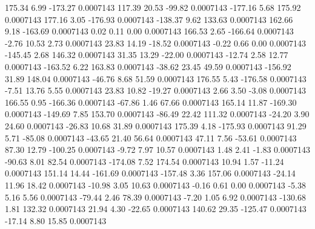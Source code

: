       175.34        6.99     -173.27     0.0007143
      117.39       20.53      -99.82     0.0007143
     -177.16        5.68      175.92     0.0007143
      177.16        3.05     -176.93     0.0007143
     -138.37        9.62      133.63     0.0007143
      162.66        9.18     -163.69     0.0007143
        0.02        0.11        0.00     0.0007143
      166.53        2.65     -166.64     0.0007143
       -2.76       10.53        2.73     0.0007143
       23.83       14.19      -18.52     0.0007143
       -0.22        0.66        0.00     0.0007143
     -145.45        2.68      146.32     0.0007143
       31.35       13.29      -22.00     0.0007143
      -12.74        2.58       12.77     0.0007143
     -163.52        6.22      163.83     0.0007143
      -38.62       23.45       49.59     0.0007143
     -156.92       31.89      148.04     0.0007143
      -46.76        8.68       51.59     0.0007143
      176.55        5.43     -176.58     0.0007143
       -7.51       13.76        5.55     0.0007143
       23.83       10.82      -19.27     0.0007143
        2.66        3.50       -3.08     0.0007143
      166.55        0.95     -166.36     0.0007143
      -67.86        1.46       67.66     0.0007143
      165.14       11.87     -169.30     0.0007143
     -149.69        7.85      153.70     0.0007143
      -86.49       22.42      111.32     0.0007143
      -24.20        3.90       24.60     0.0007143
      -26.83       10.68       31.89     0.0007143
      175.39        4.18     -175.93     0.0007143
       91.29        5.71      -85.08     0.0007143
      -43.65       21.40       56.64     0.0007143
       47.11        7.56      -53.61     0.0007143
       87.30       12.79     -100.25     0.0007143
       -9.72        7.97       10.57     0.0007143
        1.48        2.41       -1.83     0.0007143
      -90.63        8.01       82.54     0.0007143
     -174.08        7.52      174.54     0.0007143
       10.94        1.57      -11.24     0.0007143
      151.14       14.44     -161.69     0.0007143
     -157.48        3.36      157.06     0.0007143
      -24.14       11.96       18.42     0.0007143
      -10.98        3.05       10.63     0.0007143
       -0.16        0.61        0.00     0.0007143
       -5.38        5.16        5.56     0.0007143
      -79.44        2.46       78.39     0.0007143
       -7.20        1.05        6.92     0.0007143
     -130.68        1.81      132.32     0.0007143
       21.94        4.30      -22.65     0.0007143
      140.62       29.35     -125.47     0.0007143
      -17.14        8.80       15.85     0.0007143
